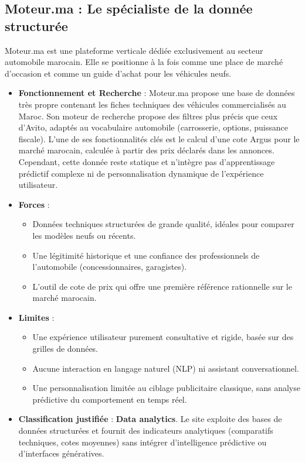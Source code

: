 \documentclass[11pt,a4paper]{article}
\begin{document}
\subsection{Moteur.ma : Le spécialiste de la donnée structurée}
Moteur.ma est une plateforme verticale dédiée exclusivement au secteur automobile marocain. Elle se positionne à la fois comme une place de marché d'occasion et comme un guide d'achat pour les véhicules neufs.

\begin{itemize}
    \item \textbf{Fonctionnement et Recherche} : Moteur.ma propose une base de données très propre contenant les fiches techniques des véhicules commercialisés au Maroc. Son moteur de recherche propose des filtres plus précis que ceux d'Avito, adaptés au vocabulaire automobile (carrosserie, options, puissance fiscale). L'une de ses fonctionnalités clés est le calcul d'une \og cote Argus \fg pour le marché marocain, calculée à partir des prix déclarés dans les annonces. Cependant, cette donnée reste statique et n'intègre pas d'apprentissage prédictif complexe ni de personnalisation dynamique de l'expérience utilisateur.
    \item \textbf{Forces} :
    \begin{itemize}
        \item Données techniques structurées de grande qualité, idéales pour comparer les modèles neufs ou récents.
        \item Une légitimité historique et une confiance des professionnels de l'automobile (concessionnaires, garagistes).
        \item L'outil de cote de prix qui offre une première référence rationnelle sur le marché marocain.
    \end{itemize}
    \item \textbf{Limites} :
    \begin{itemize}
        \item Une expérience utilisateur purement consultative et rigide, basée sur des grilles de données.
        \item Aucune interaction en langage naturel (NLP) ni assistant conversationnel.
        \item Une personnalisation limitée au ciblage publicitaire classique, sans analyse prédictive du comportement en temps réel.
    \end{itemize}
    \item \textbf{Classification justifiée} : \textbf{Data analytics}. Le site exploite des bases de données structurées et fournit des indicateurs analytiques (comparatifs techniques, cotes moyennes) sans intégrer d'intelligence prédictive ou d'interfaces génératives.
\end{itemize}
\end{document}
